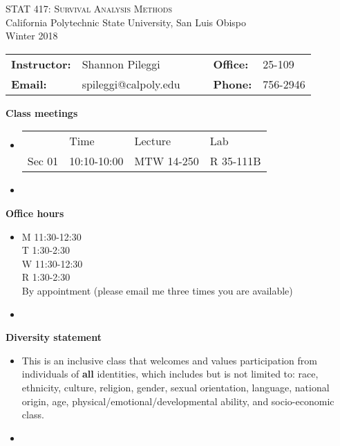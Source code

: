\documentclass[letterpaper,12pt]{report}
\begin{document}
\begin{center}
\large{\textsc{STAT 417: Survival Analysis Methods}}\\
California Polytechnic State University, San Luis Obispo\\
Winter 2018\\
\end{center}
\vskip10pt
\begin{center}
{\renewcommand{\arraystretch}{1.5}
\begin{tabular}{llllll}
\hline
\textbf{Instructor:} & Shannon Pileggi       &&& \textbf{Office:} & 25-109 \\
\textbf{Email:}      & spileggi@calpoly.edu  &&& \textbf{Phone:} & 756-2946 \\
\hline
\end{tabular}}
\end{center}

\vskip15pt

\textbf{Class meetings}
\begin{itemize}
\item[]
\begin{tabular}{llll}
       & Time       & Lecture &  Lab \\
Sec 01 & 10:10-10:00  & MTW 14-250 & R 35-111B \\
\end{tabular}
\item[]
\end{itemize}

\textbf{Office hours}
\begin{itemize}
\item[] M 11:30-12:30 \\ T \hspace{0.1ex} 1:30-2:30 \\ W 11:30-12:30 \\ R \hspace{0.1ex} 1:30-2:30 \\ By appointment (please email me three times you are available)
\item[]
\end{itemize}

\textbf{Diversity statement}
\begin{itemize}
\item[] This is an inclusive class that welcomes and values participation from individuals of \textbf{all} identities, which includes but is not limited to: race, ethnicity, culture, religion, gender, sexual orientation, language, national origin, age, physical/emotional/developmental ability, and socio-economic class.
\item[]
\end{itemize}
\end{document}
